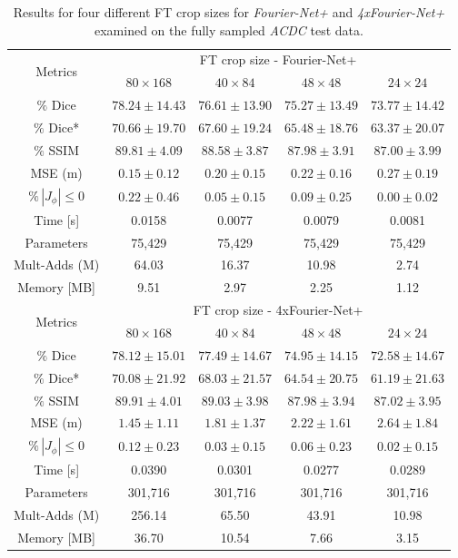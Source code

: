 \begin{table}[h] %
	\centering
	\caption{Results for four different FT crop sizes for \emph{Fourier-Net+} and \emph{4xFourier-Net+} examined on the fully sampled \emph{ACDC} test data.}
	\label{tab:FTCropSize}
	\begin{tabular}{c c c c c} %
		\toprule
		\multirow{2}{*}{Metrics} & \multicolumn{4}{c}{FT crop size - Fourier-Net+} \\
		\cmidrule(lr){2-5}
		 & $80 \times 168$ & $40 \times 84$ & $48 \times 48$ & $24 \times 24$ \\		
		\midrule
		$\%$ Dice & $78.24 \pm 14.43$ & $76.61 \pm 13.90$ & $75.27 \pm 13.49$ & $73.77 \pm 14.42$ \\
		$\%$ Dice* & $70.66 \pm 19.70$ & $67.60 \pm 19.24$ & $65.48 \pm 18.76$ & $63.37 \pm 20.07$ \\
		$\%$ SSIM & $89.81 \pm 4.09$ & $88.58 \pm 3.87$ & $87.98 \pm 3.91$ & $87.00 \pm 3.99$ \\
		MSE (m) & $0.15 \pm 0.12$ & $0.20 \pm 0.15$ & $0.22 \pm 0.16$ & $0.27 \pm 0.19$ \\
		$\% \, |J_{\phi}|\leq0$ & $0.22 \pm 0.46$ & $0.05 \pm 0.15$ & $0.09 \pm 0.25$ & $0.00 \pm 0.02$ \\		
		Time [s] 	  & 0.0158 & 0.0077 & 0.0079 & 0.0081 \\
		Parameters 	  & 75,429 & 75,429 & 75,429 & 75,429 \\
		Mult-Adds (M) & 64.03  & 16.37  & 10.98  & 2.74 \\
		Memory [MB] 	  & 9.51   & 2.97   & 2.25   & 1.12 \\
		\midrule
		\multirow{2}{*}{Metrics} & \multicolumn{4}{c}{FT crop size - 4xFourier-Net+} \\
		\cmidrule(lr){2-5}
		 & $80 \times 168$ & $40 \times 84$ & $48 \times 48$ & $24 \times 24$ \\		
		\midrule
		$\%$ Dice & $78.12 \pm 15.01$ & $77.49 \pm 14.67$ & $74.95 \pm 14.15$ & $72.58 \pm 14.67$ \\
		$\%$ Dice* & $70.08 \pm 21.92$ & $68.03 \pm 21.57$ & $64.54 \pm 20.75$ & $61.19 \pm 21.63$ \\
		$\%$ SSIM & $89.91 \pm 4.01$ & $89.03 \pm 3.98$ & $87.98 \pm 3.94$ & $87.02 \pm 3.95$ \\
		MSE (m) & $1.45 \pm 1.11$ & $1.81 \pm 1.37$ & $2.22 \pm 1.61$ & $2.64 \pm 1.84$ \\
		$\% \, |J_{\phi}|\leq0$ & $0.12 \pm 0.23$ & $0.03 \pm 0.15$ & $0.06 \pm 0.23$ & $0.02 \pm 0.15$ \\	
		Time [s] 	 & 0.0390  & 0.0301  & 0.0277  & 0.0289 \\
		Parameters 	 & 301,716 & 301,716 & 301,716 & 301,716 \\
		Mult-Adds (M)& 256.14  & 65.50   & 43.91   & 10.98 \\
		Memory [MB] 	 & 36.70   & 10.54   & 7.66    & 3.15 \\
		\bottomrule
	\end{tabular}
\end{table}

